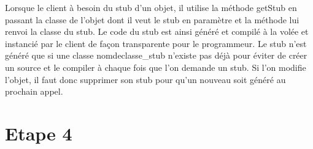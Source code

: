 \documentclass[a4paper,12pt]{article}
\begin{document}
Lorsque le client à besoin du stub d'un objet, il utilise la méthode getStub en passant la classe de l'objet dont il veut le stub en paramètre et la méthode lui renvoi la classe du stub. Le code du stub est ainsi généré et compilé à la volée et instancié par le client de façon transparente pour le programmeur. Le stub n'est généré que si une classe nomdeclasse\_stub n'existe pas déjà pour éviter de créer un source et le compiler à chaque fois que l'on demande un stub. Si l'on modifie l'objet, il faut donc supprimer son stub pour qu'un nouveau soit généré au prochain appel.

\clearpage
\section{Etape 4}
\end{document}
